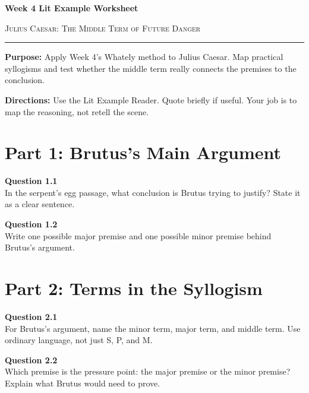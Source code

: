 \documentclass[12pt]{article}
\begin{document}
\begin{center}
{\LARGE\bfseries Week 4 Lit Example Worksheet}\par\vspace{0.05em}
{\large\scshape Julius Caesar: The Middle Term of Future Danger}\par\vspace{0.12em}
\rule{0.78\textwidth}{0.5pt}
\end{center}

\textbf{Purpose:} Apply Week 4's Whately method to Julius Caesar. Map practical syllogisms and test whether the middle term really connects the premises to the conclusion.

\textbf{Directions:} Use the Lit Example Reader. Quote briefly if useful. Your job is to map the reasoning, not retell the scene.

\section*{Part 1: Brutus's Main Argument}

\textbf{Question 1.1}\\[-0.15em]
In the serpent's egg passage, what conclusion is Brutus trying to justify? State it as a clear sentence.


\textbf{Question 1.2}\\[-0.15em]
Write one possible major premise and one possible minor premise behind Brutus's argument.


\newpage

\section*{Part 2: Terms in the Syllogism}

\textbf{Question 2.1}\\[-0.15em]
For Brutus's argument, name the minor term, major term, and middle term. Use ordinary language, not just S, P, and M.


\textbf{Question 2.2}\\[-0.15em]
Which premise is the pressure point: the major premise or the minor premise? Explain what Brutus would need to prove.

\end{document}
